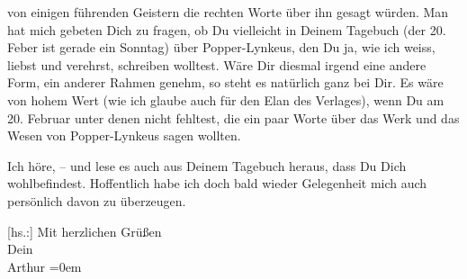                von einigen führenden Geistern die rechten Worte über ihn gesagt würden. Man hat mich
               gebeten Dich zu fragen, ob Du vielleicht in Deinem Tagebuch (der 20. Feber ist gerade ein Sonntag) über Popper-Lynkeus, den Du ja, wie ich weiss, liebst und verehrst, schreiben
               wolltest. Wäre Dir diesmal irgend eine andere Form, ein anderer Rahmen genehm, so
               steht es natürlich ganz bei Dir. Es wäre von hohem Wert (wie ich glaube auch für den
               Elan des Verlages), wenn Du am 20. Februar unter denen nicht fehltest,
               die ein paar Worte über das Werk und das Wesen von Popper-Lynkeus sagen wollten.\pend
           
\pstart
           Ich höre\introOben{}, –\introOben{} und lese es auch aus Deinem Tagebuch heraus, dass Du Dich wohlbefindest. Hoffentlich habe ich
               doch bald wieder Gelegenheit mich auch persönlich davon zu überzeugen.\pend
           
\pstart
           {[}hs.:{]} Mit herzlichen Grüßen{\\[\baselineskip]}Dein{\\[\baselineskip]}\spacefill\mbox{Arthur}\pend
           \leftskip=0em{}\endnumbering{}  \newcommand{\dateiname}{L02360}\newcommand{\titel}{Arthur Schnitzler an Hermann Bahr, 7. 2. 1921}\newcommand{\editorInnen}{Herausgegeben von Martin Anton Müller}
